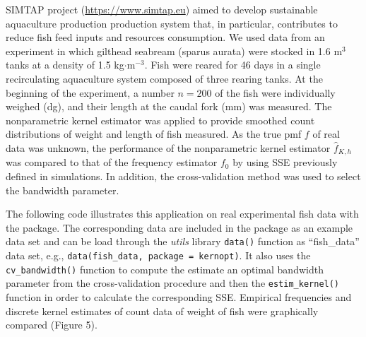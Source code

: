 SIMTAP project (\url{https://www.simtap.eu}) aimed to develop sustainable aquaculture production production system that, in particular, contributes to reduce fish feed inputs and resources consumption. We used data from an experiment in which gilthead seabream (sparus aurata) were stocked in 1.6 m\(^{3}\) tanks at a density of 1.5 kg\(\cdot\)m\(^{-3}\). Fish were reared for 46 days in a single recirculating aquaculture system composed of three rearing tanks. At the beginning of the experiment, a number \(n=200\) of the fish were individually weighed (dg), and their length at the caudal fork (mm) was measured. The nonparametric kernel estimator was applied to provide smoothed count distributions of weight and length of fish measured. As the true pmf \(f\) of real data was unknown, the performance of the nonparametric kernel estimator \(\widehat{f}_{K, h}\) was compared to that of the frequency estimator \(f_{0}\) by using {SSE previously defined in simulations. In addition, the cross-validation method was used to select the bandwidth parameter}.

The following code illustrates this application on real experimental fish data with the  package. The corresponding data are included in the package as an example data set and can be load through the \emph{utils} library \texttt{data()} function as ``fish\_data'' data set, e.g., \texttt{data(\textquotesingle{}fish\_data\textquotesingle{},\ package\ =\ \textquotesingle{}kernopt\textquotesingle{})}.
It also uses the  \texttt{cv\_bandwidth()} function to compute the estimate an optimal bandwidth parameter from the cross-validation procedure and then the \texttt{estim\_kernel()} function in order to calculate the corresponding SSE. Empirical frequencies and discrete kernel estimates of count data of weight of fish were graphically compared (Figure 5).


